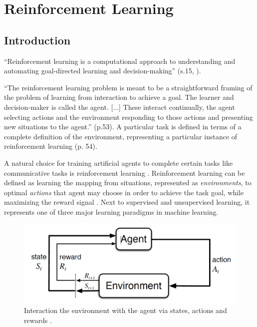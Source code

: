 \section{Reinforcement Learning}

\subsection{Introduction}
``Reinforcement learning is a computational approach to understanding and automating goal-directed learning and decision-making'' (s.15, \cite{sutton2018reinforcement}).

``The reinforcement learning problem is meant to be a straightforward framing of the problem of learning from interaction to achieve a goal. The learner and decision-maker is called the agent. [...] These interact continually, the agent selecting actions and the environment responding to those actions and presenting new situations to the agent.'' (p.53). A particular task is defined in terms of a complete definition of the environment, representing a particular instance of reinforcement learning (p. 54).

A natural choice for training artificial agents to complete certain tasks like communicative tasks is reinforcement learning . 
Reinforcement learning can be defined as learning the mapping from situations, represented as \textit{environments}, to optimal \textit{actions} that agent may choose in order to achieve the task goal, while maximizing the reward signal \parencite{sutton2018reinforcement}. Next to supervised and unsupervised learning, it represents one of three major learning paradigms in machine learning. 

\begin{figure}
	\centering
	\includegraphics[width=0.8\linewidth]{images/rl_intro.png}
	\caption{Interaction the environment with the agent via states, actions and rewards \parencite{sutton2018reinforcement}.}
	\label{fig:rl}
\end{figure}

